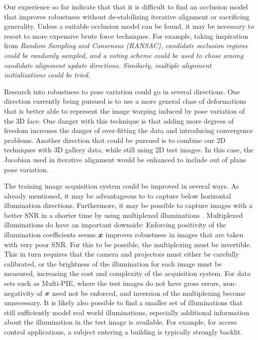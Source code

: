 Our experience so far indicate that that it is difficult to find an occlusion
model that improves robustness without de-stabilizing iterative alignment or
sacrificing generality.  Unless a suitable occlusion model can be found, it may
be necessary to resort to more expensive brute force techniques. For example,
taking inspiration from \em{Random Sampling and Consensus} (RANSAC), candidate
occlusion regions could be randomly sampled, and a voting scheme could be used
to chose among candidate alignment update directions.  Similarly, multiple
alignment initializations could be tried. 

Research into robustness to pose variation could go in several directions.  One
direction currently being pursued is to use a more general class of
deformations that is better able to represent the image warping induced by pose
variation of the 3D face.  One danger with this technique is that adding more
degrees of freedom increases the danger of over-fitting the data and
introducing convergence problems.  Another direction that could be pursued is
to combine our 2D techniques with 3D gallery data, while still using 2D test
images.  In this case, the Jacobian used in iterative alignment would be
enhanced to include out of plane pose variation.

The training image acquisition system could be improved in several ways.  As
already mentioned, it may be advantageous to to capture below horizontal
illumination directions.  Furthermore, it may be possible to capture images
with a better SNR in a shorter time by using multiplexed illuminations
\cite{schechner2007multiplexing}.  Multiplexed illuminations do have an
important downside: Enforcing positivity of the illumination coefficients seems
${\boldsymbol{x}}$ improves robustness in images that are taken with very poor SNR.  For this
to be possible, the multiplexing must be invertible.  This in turn requires
that the camera and projectors must either be carefully calibrated, or the
brightness of the illumination for each image must be measured, increasing the
cost and complexity of the acquisition system.  For data sets such as
Multi-PIE, where the test images do not have gross errors, non-negativity of
${\boldsymbol{x}}$ need not be enforced, and inversion of the multiplexing become
unnecessary.  It is likely also possible to find a smaller set of illuminations
that still sufficiently model real world illuminations, especially additional
information about the illumination in the test image is available.  For
example, for access control applications, a subject entering a building is
typically strongly backlit.




